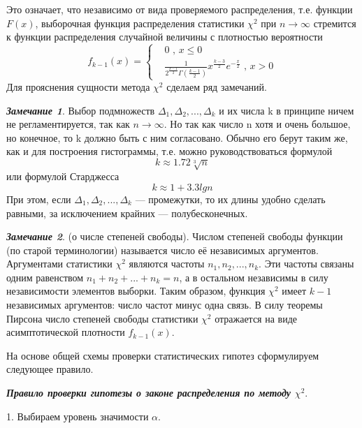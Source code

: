 \documentclass[a4paper]{article}
\begin{document}
Это означает, что независимо от вида проверяемого распределения, т.е. функции $F(x)$, выборочная функция распределения статистики $\chi^{2}$ при $n \rightarrow \infty$  стремится к функции распределения случайной величины с плотностью вероятности 
\begin{equation}
f_{k - 1}(x) = 
\begin{cases}
& 0 \text{ , } x  \leq 0  \\ 
& \frac{1}{2^{\frac{k-1}{2}}\Gamma(\frac{k-1}{2})}x^{\frac{k-3}{2}}e^{-\frac{x}{2}}
\text{ , } x>0 
\end{cases}
\label{f_k-1}
\end{equation}
Для прояснения сущности метода $\chi^{2}$ сделаем ряд замечаний.

\textbf{\textit{Замечание 1}}. Выбор подмножеств $\Delta_{1},\Delta_{2}, ... ,\Delta_{k}$ и их числа k в принципе ничем не регламентируется, так как $n \rightarrow \infty$. Но так как число n хотя и очень большое, но конечное, то k должно быть с ним согласовано. Обычно его берут таким же, как и для построения гистограммы, т.е. можно руководствоваться формулой
\begin{equation}
k \approx 1.72\sqrt[3]{n}
\label{k_1}
\end{equation}
или формулой Старджесса
\begin{equation}
k \approx 1 + 3.3lgn
\end{equation}
При этом, если  $\Delta_{1},\Delta_{2}, ... ,\Delta_{k}$ — промежутки, то их длины удобно сделать равными, за исключением крайних — полубесконечных.

\textbf{\textit{Замечание 2}}. (о числе степеней свободы).
Числом степеней свободы функции (по старой терминологии) называется число её независимых аргументов. Аргументами статистики $\chi^{2}$ являются частоты $n_{1},n_{2}, ... ,n_{k}$. Эти частоты связаны одним равенством $n_{1} + n_{2} + ... + n_{k}  = n$, а в остальном независимы в силу независимости элементов выборки. Таким образом, функция $\chi^{2}$  имеет $k-1$ независимых аргументов: число частот минус одна связь. В силу теоремы Пирсона число степеней свободы статистики $\chi^{2}$  отражается на виде асимптотической плотности $f_{k - 1}(x)$.

На основе общей схемы проверки статистических гипотез сформулируем следующее правило.

\textbf{\textit{Правило проверки гипотезы о законе распределения по методу $\chi^{2}$}}.

1. Выбираем уровень значимости $\alpha$.
\end{document}

